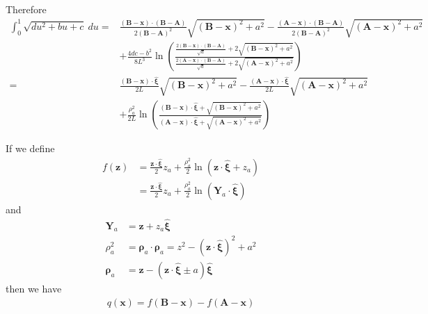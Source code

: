 \documentclass[10pt]{report}
\begin{document}
{Therefore
\begin{align}
\int_0^1\sqrt{du^2+bu+c}\ du
=&\frac{(\bm B-\bm x)\cdot(\bm B-\bm A)}{2(\bm B-\bm A)^2}\sqrt{(\bm B-\bm x)^2+a^2}-\frac{(\bm A-\bm x)\cdot(\bm B-\bm A)}{2(\bm B-\bm A)^2}\sqrt{(\bm A-\bm x)^2+a^2}\nonumber\\
&+\frac{4dc-b^2}{8L^3}\ln\left(\frac{\frac{2(\bm B-\bm x)\cdot(\bm B-\bm A)}{\sqrt{d}}+2\sqrt{(\bm B-\bm x)^2+a^2}}{\frac{2(\bm A-\bm x)\cdot(\bm B-\bm A)}{\sqrt{d}}+2\sqrt{(\bm A-\bm x)^2+a^2}}\right)\nonumber\\
=&\frac{(\bm B-\bm x)\cdot\hat{\bm\xi}}{2L}\sqrt{(\bm B-\bm x)^2+a^2}-\frac{(\bm A-\bm x)\cdot\hat{\bm\xi}}{2L}\sqrt{(\bm A-\bm x)^2+a^2}\nonumber\\
&+\frac{\rho^2_a}{2L}\ln\left(\frac{(\bm B-\bm x)\cdot\hat{\bm\xi}+\sqrt{(\bm B-\bm x)^2+a^2}}{(\bm A-\bm x)\cdot\hat{\bm\xi}+\sqrt{(\bm A-\bm x)^2+a^2}}\right)
\end{align}

If we define
\begin{align}
f(\bm z)
&=\frac{\bm z\cdot\hat{\bm\xi}}{2}z_a + \frac{\rho^2_a}{2}\ln\left(\bm z\cdot\hat{\bm\xi}+z_a\right)\nonumber\\
&=\frac{\bm z\cdot\hat{\bm\xi}}{2}z_a + \frac{\rho^2_a}{2}\ln\left(\bm Y_a\cdot\hat{\bm \xi}\right)
\end{align}
and
\begin{align}
\bm Y_a&=\bm z+z_a\hat{\bm\xi}\\
\rho_a^2&=\bm \rho_a\cdot\bm \rho_a=z^2-(\bm z\cdot\hat{\bm \xi})^2+a^2\\
\bm \rho_a&=\bm z-(\bm z\cdot\hat{\bm\xi}\pm a)\hat{\bm\xi}
\end{align}
then  we have
\begin{align}
q(\bm x)=f(\bm B-\bm x)-f(\bm A-\bm x)
\end{align}

}
\end{document}
